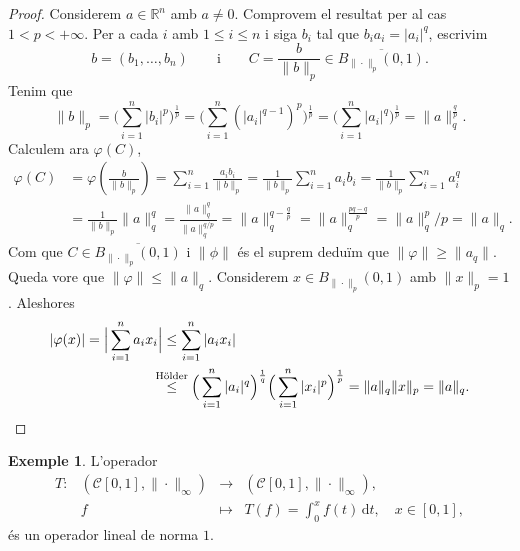 \documentclass[12pt]{book}
\theoremstyle{definition}
\theoremstyle{nota}
\theoremstyle{exemple}
\newtheorem{exemple}[teorema]{Exemple}
\begin{document}
\begin{proof}
  Considerem $a \in \mathbb{R}^n$ amb $a \neq 0$. Comprovem el resultat per al cas $1 < p < + \infty$. Per a cada $i$ amb $1 \leq i \leq n$ i siga $b_i$ tal que $b_i a_i = |a_i|^q$, escrivim
  \[
    b = (b_1, \dotsc, b_n) \qquad \text{i} \qquad C =
    \frac{b}{\|b\|_p} \in \overline{B_{\|\cdot\|_p} (0,1)}.
  \]
  Tenim que
  \[
    \|b\|_p = \Big( \sum_{i=1}^{n} |b_i|^p \Big)^{\frac{1}{p}} = \Big(
    \sum_{i=1}^{n} \left( |a_i|^{q-1} \right)^p \Big)^{\frac{1}{p}} =
    \Big( \sum_{i=1}^{n} |a_i|^q \Big)^{\frac{1}{p}} =
    \|a\|_q^{\frac{q}{p}}.
  \]
  Calculem ara $\varphi(C)$,
  \begin{align*}
    \varphi(C)
    &= \varphi\left( \frac{b}{\|b\|_p} \right)
      = \sum_{i=1}^{n} \frac{a_ib_i}{\|b\|_p}
      = \frac{1}{\|b\|_p} \sum_{i=1}^{n} a_ib_i
      = \frac{1}{\|b\|_p} \sum_{i=1}^{n} a_i^q \\
    &= \frac{1}{\|b\|_p} \|a\|_q^q 
      = \frac{\|a\|_q^q}{\|a\|_q^{q/p}}
      = \|a\|_q^{q - \frac{q}{p}}
      = \|a\|_q^{\frac{pq-q}{p}}
      = \|a\|_q^p/p
      = \|a\|_q.
  \end{align*}
  Com que $C \in \overline{B_{\|\cdot\|_p}(0,1)}$ i $\|\phi\|$ és el
  suprem deduïm que $\|\varphi\| \geq \|a_q\|$. Queda vore que
  $\|\varphi\| \leq \|a\|_q$. Considerem $x \in B_{\|\cdot\|_p}(0,1)$
  amb $\|x\|_p = 1$. Aleshores
  \begin{align*}
    |\varphi(x)| = \Big| \sum_{i=1}^{n} a_i x_i \Big|
    &\leq \sum_{i=1}^{n} |a_i x_i| \\
    &\overset{\mathclap{\text{Hölder}}}{\leq} \;\;\,
      \Big(\sum_{i=1}^{n} |a_i|^q \Big)^{\frac{1}{q}}
      \Big( \sum_{i=1}^{n} |x_i|^p \Big)^{\frac{1}{p}}
      = \|a\|_q \|x\|_p = \|a\|_q. \qedhere
  \end{align*}
\end{proof}

\begin{exemple}
  L'operador
  \[
    \begin{array}{lrcl}
      T :
      & (\mathcal{C}[0,1], \|\cdot\|_\infty) & \longrightarrow
      & (\mathcal{C}[0,1], \|\cdot\|_\infty), \\
      & f &\longmapsto
      & T(f) = \int_0^x f(t)\, \mathrm{d}t, \quad x \in [0,1],
    \end{array}
  \]
  és un operador lineal de norma $1$.
\end{exemple}
\end{document}
